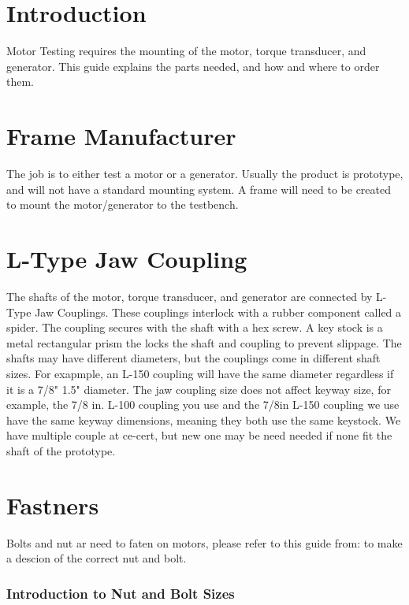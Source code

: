 \documentclass[12pt, a4paper]{article}
\begin{document}
	\part{Introduction}
	 	Motor Testing requires the mounting of the motor, torque transducer, and generator. This guide explains the parts needed, and how and where to order them.
	 	
	\part{Frame Manufacturer} 
		The job is to either test a motor or a generator. Usually the product is prototype, and will not have a standard mounting system. A frame will need to be created to mount the motor/generator to the testbench.
		
	\part{L-Type Jaw Coupling}
		The shafts of the motor, torque transducer, and generator are connected by L-Type Jaw Couplings. These couplings interlock with a rubber component called a spider. The coupling secures with the shaft with a hex screw. A key stock is a metal rectangular prism the locks the shaft and coupling to prevent slippage. The shafts may have different diameters, but the couplings come in different shaft sizes. For exapmple, an L-150 coupling will have the same diameter regardless if it is a 7/8" 1.5" diameter.  The jaw coupling size does not affect keyway size, for example, the 7/8 in. L-100 coupling you use and the 7/8in L-150 coupling we use have the same keyway dimensions, meaning they both use the same keystock. We have multiple couple at ce-cert, but new one may be need needed if none fit the shaft of the prototype.		
	
	\part{Fastners}
	    Bolts and nut ar need to faten on motors, please refer to this guide from: to make a descion of the correct nut and bolt.
		\hypertarget{introduction-to-nut-and-bolt-sizes}{%
			\section{\texorpdfstring{{Introduction to Nut and Bolt
						Sizes}}{Introduction to Nut and Bolt Sizes}}\label{introduction-to-nut-and-bolt-sizes}}
		
		\hypertarget{isolation-scope-ifxaekaopxrq6yt1cpor23715}{}
		
\end{document}
